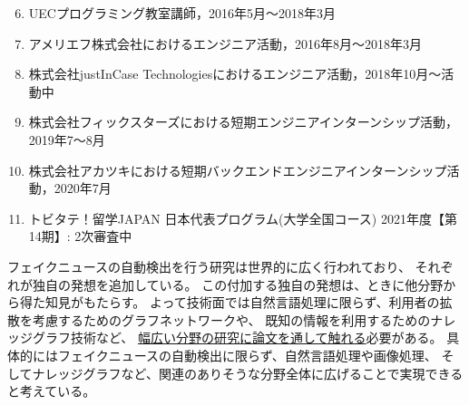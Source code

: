 \vspace{-3mm}
\begin{enumerate}
    \setcounter{enumi}{5}
    \setlength{\parskip}{0cm}
    \setlength{\itemsep}{0cm}
    \item UECプログラミング教室講師，2016年5月〜2018年3月\cite{uecprog} \label{enum:prog}
    \item アメリエフ株式会社におけるエンジニア活動，2016年8月〜2018年3月\cite{amelieff} \label{enum:amelieff}
    \item 株式会社justInCase Technologiesにおけるエンジニア活動，2018年10月〜活動中\cite{jic-tech} \label{enum:jict}
    \item 株式会社フィックスターズにおける短期エンジニアインターンシップ活動，2019年7〜8月 \label{enum:fixstars}
    \item 株式会社アカツキにおける短期バックエンドエンジニアインターンシップ活動，2020年7月 \label{enum:ak}
\end{enumerate}
\vspace{-3mm}
\begin{enumerate}
    \setcounter{enumi}{10}
    \setlength{\parskip}{0cm}
    \setlength{\itemsep}{0cm}
    \item トビタテ！留学JAPAN 日本代表プログラム(大学全国コース) 2021年度【第14期】: 2次審査中 \label{enum:tobitate}
\end{enumerate}

\noindent
{}
フェイクニュースの自動検出を行う研究は世界的に広く行われており、
それぞれが独自の発想を追加している。
この付加する独自の発想は、ときに他分野から得た知見がもたらす。
よって技術面では自然言語処理に限らず、利用者の拡散を考慮するためのグラフネットワークや、
既知の情報を利用するためのナレッジグラフ技術など、
\underline{幅広い分野の研究に論文を通して触れる}必要がある。
具体的にはフェイクニュースの自動検出に限らず、自然言語処理や画像処理、
そしてナレッジグラフなど、関連のありそうな分野全体に広げることで実現できると考えている。

